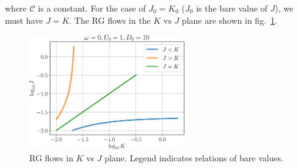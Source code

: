 \documentclass[twoside]{report}
\numberwithin{equation}{section}
\begin{document}
where \(\mathcal{C}\) is a constant. For the case of \(J_0 = K_0\) (\(J_0\) is the bare value of \(J\)), we must have \(J=K\). The RG flows in the \(K \text{ vs } J\) plane are shown in fig.~\ref{JvsK}.
\begin{figure}[htpb]
	\centering
	\includegraphics[width=0.6\textwidth]{../figures/JvsK.pdf}
	\caption{RG flows in \(K\) vs \(J\) plane. Legend indicates relations of bare values.}
	\label{JvsK}
\end{figure}
\end{document}
